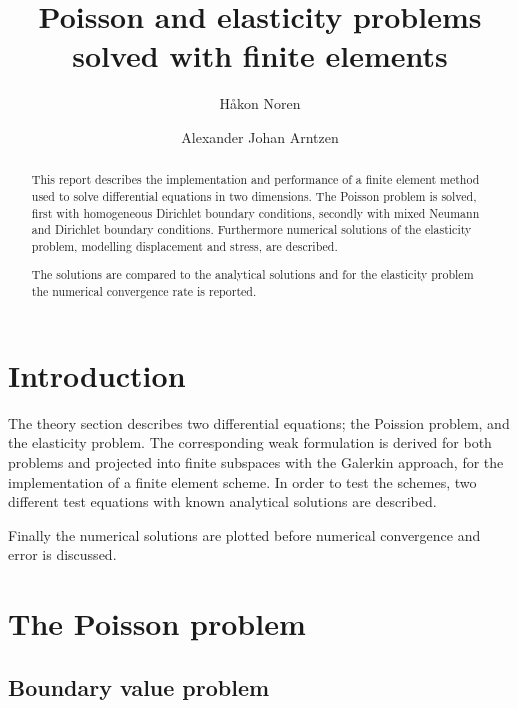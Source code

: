 \documentclass[a4paper,english]{elsarticle}%
\begin{document}
\begin{frontmatter}

\title{Poisson and elasticity problems solved with finite elements}
\author[matematikk]{Håkon Noren}

\author[matematikk]{Alexander Johan Arntzen }

\address[matematikk]{Department of Mathematical Science, Norwegian University of Science and Technology, N-7491 Trondheim, Norway.}


\begin{abstract}
This report describes the implementation and performance of a finite element method used to solve differential equations in two dimensions. The Poisson problem is solved, first with homogeneous Dirichlet boundary conditions, secondly with mixed Neumann and Dirichlet boundary conditions. Furthermore numerical solutions of the elasticity problem, modelling displacement and stress, are described.

The solutions are compared to the analytical solutions and for the elasticity problem the numerical convergence rate is reported.
\end{abstract}

\end{frontmatter}


\section{Introduction}
The theory section describes two differential equations; the Poission problem, and the elasticity problem. The corresponding weak formulation is derived for both problems and projected into finite subspaces with the Galerkin approach, for the implementation of a finite element scheme. In order to test the schemes, two different test equations with known analytical solutions are described.

Finally the numerical solutions are plotted before numerical convergence and error is discussed.

\section{The Poisson problem}

\subsection{Boundary value problem}
\end{document}
